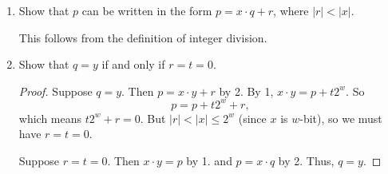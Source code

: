 \documentclass[11pt, oneside, a4paper]{article}
\begin{document}
\begin{enumerate}
\begin{proof}
        By this equation, $x\cdot y=p$ if and only if $t=0$, which is when the multiplication does not overflow.
    \end{proof}

    \item Show that $p$ can be written in the form $p = x \cdot q + r$, where $|r| < |x|$.
    
    This follows from the definition of integer division.

    \item Show that $q = y$ if and only if $r = t = 0$.
    \begin{proof}
        Suppose $q=y$. Then $p=x\cdot y+r$ by 2. By 1, $x\cdot y = p + t2^w$. So
        \[p = p + t2^w + r,\]
        which means $t2^w+r=0$. But $|r|<|x|\leq 2^w$ (since $x$ is $w$-bit), so we must have $r=t=0$.

        Suppose $r=t=0$. Then $x\cdot y = p$ by 1. and $p = x\cdot q$ by 2. Thus, $q=y$.
    \end{proof}

\end{enumerate}
\end{document}
